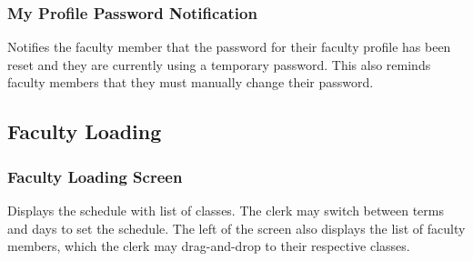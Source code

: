     \subsubsection{My Profile Password Notification}
    
    
    
     {Notifies the faculty member that the password for their faculty profile has been reset and they are currently using a temporary password. This also reminds faculty members that they must manually change their password.}
    
    

    \pagebreak
    
    
    \subsection{Faculty Loading}
    
    \subsubsection{Faculty Loading Screen}
    
    
    
     {Displays the schedule with list of classes. The clerk may switch between terms and days to set the schedule. The left of the screen also displays the list of faculty members, which the clerk may drag-and-drop to their respective classes.}
    
